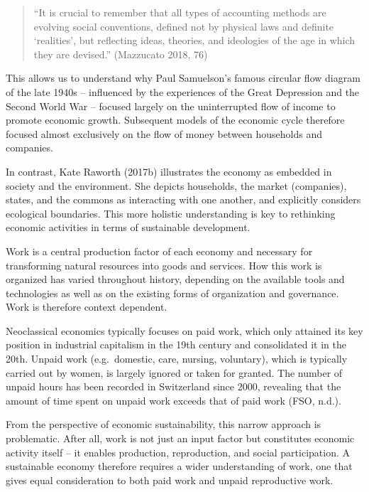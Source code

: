 \documentclass[
  a4paper,
  DIV=11,
  numbers=noendperiod,
  oneside,
  openany]{scrreprt}
\begin{document}
\begin{quote}
``It is crucial to remember that all types of accounting methods are
evolving social conventions, defined not by physical laws and definite
`realities', but reflecting ideas, theories, and ideologies of the age
in which they are devised.'' (Mazzucato 2018, 76)
\end{quote}

This allows us to understand why Paul Samuelson's famous circular flow
diagram of the late 1940s -- influenced by the experiences of the Great
Depression and the Second World War -- focused largely on the
uninterrupted flow of income to promote economic growth. Subsequent
models of the economic cycle therefore focused almost exclusively on the
flow of money between households and companies.

In contrast, Kate Raworth (2017b) illustrates the economy as embedded in
society and the environment. She depicts households, the market
(companies), states, and the commons as interacting with one another,
and explicitly considers ecological boundaries. This more holistic
understanding is key to rethinking economic activities in terms of
sustainable development.

\begin{tcolorbox}[enhanced jigsaw, arc=.35mm, bottomrule=.15mm, bottomtitle=1mm, breakable, colback=white, colbacktitle=quarto-callout-note-color!10!white, colframe=quarto-callout-note-color-frame, coltitle=black, left=2mm, leftrule=.75mm, opacityback=0, opacitybacktitle=0.6, rightrule=.15mm, title={Work is more than paid work}, titlerule=0mm, toprule=.15mm, toptitle=1mm]

Work is a central production factor of each economy and necessary for
transforming natural resources into goods and services. How this work is
organized has varied throughout history, depending on the available
tools and technologies as well as on the existing forms of organization
and governance. Work is therefore context dependent.

Neoclassical economics typically focuses on paid work, which only
attained its key position in industrial capitalism in the 19th century
and consolidated it in the 20th. Unpaid work (e.g.~domestic, care,
nursing, voluntary), which is typically carried out by women, is largely
ignored or taken for granted. The number of unpaid hours has been
recorded in Switzerland since 2000, revealing that the amount of time
spent on unpaid work exceeds that of paid work (FSO, n.d.).

From the perspective of economic sustainability, this narrow approach is
problematic. After all, work is not just an input factor but constitutes
economic activity itself -- it enables production, reproduction, and
social participation. A sustainable economy therefore requires a wider
understanding of work, one that gives equal consideration to both paid
work and unpaid reproductive work.

\end{tcolorbox}
\end{document}
